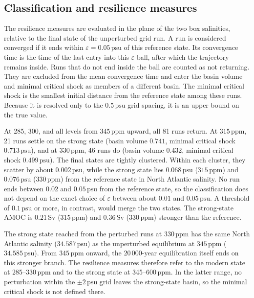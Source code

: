 \documentclass[12pt, a4paper]{article}
\newcommand{\Sv}{\,\text{Sv}}    %
\newcommand{\psu}{\,\text{psu}}
\begin{document}
\subsection*{Classification and resilience measures}

The resilience measures are evaluated in the plane of the two box salinities, relative to the final state of the unperturbed grid run. A run is considered converged if it ends within $\varepsilon=0.05\psu{}$ of this reference state. Its convergence time is the time of the last entry into this $\varepsilon$-ball, after which the trajectory remains inside. Runs that do not end inside the ball are counted as not returning. They are excluded from the mean convergence time and enter the basin volume and minimal critical shock as members of a different basin. The minimal critical shock is the smallest initial distance from the reference state among these runs. Because it is resolved only to the $0.5\psu{}$ grid spacing, it is an upper bound on the true value.

At 285, 300, and all levels from $345\,\text{ppm}$ upward, all 81 runs return. At $315\,\text{ppm}$, 21 runs settle on the strong state (basin volume $0.741$, minimal critical shock $0.713\psu{}$), and at $330\,\text{ppm}$, 46 runs do (basin volume $0.432$, minimal critical shock $0.499\psu{}$). The final states are tightly clustered. Within each cluster, they scatter by about $0.002\psu{}$, while the strong state lies $0.068\psu{}$ ($315\,\text{ppm}$) and $0.076\psu{}$ ($330\,\text{ppm}$) from the reference state in North Atlantic salinity. No run ends between $0.02$ and $0.05\psu{}$ from the reference state, so the classification does not depend on the exact choice of $\varepsilon$ between about $0.01$ and $0.05\psu{}$. A threshold of $0.1\psu{}$ or more, in contrast, would merge the two states. The strong-state AMOC is $0.21\Sv{}$ ($315\,\text{ppm}$) and $0.36\Sv{}$ ($330\,\text{ppm}$) stronger than the reference.

The strong state reached from the perturbed runs at $330\,\text{ppm}$ has the same North Atlantic salinity ($34.587\psu{}$) as the unperturbed equilibrium at $345\,\text{ppm}$ ($34.585\psu{}$). From $345\,\text{ppm}$ onward, the $20\,000$-year equilibration itself ends on this stronger branch. The resilience measures therefore refer to the modern state at 285--$330\,\text{ppm}$ and to the strong state at 345--$600\,\text{ppm}$. In the latter range, no perturbation within the $\pm2\psu{}$ grid leaves the strong-state basin, so the minimal critical shock is not defined there.
\end{document}
